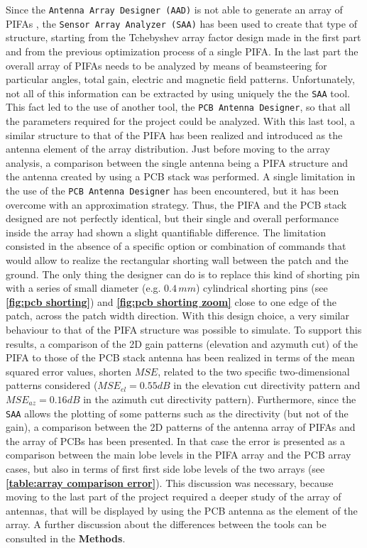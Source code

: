 \documentclass[10 pt,a4paper,twocolumn]{article}
\begin{document}
{Since the \texttt{Antenna Array Designer (AAD)} is not able to generate an array of PIFAs , the \texttt{Sensor Array Analyzer (SAA)} has been used to create that type of structure, starting from the Tchebyshev array factor design made in the first part and from the previous optimization process of a single PIFA. In the last part the overall array of PIFAs needs to be analyzed by means of beamsteering for particular angles, total gain, electric and magnetic field patterns. Unfortunately, not all of this information can be extracted by using uniquely the the \texttt{SAA} tool. This fact led to the use of another tool, the \texttt{PCB Antenna Designer}, so that all the parameters required for the project could be analyzed. With this last tool, a similar structure to that of the PIFA has been realized and introduced as the antenna element of the array distribution. Just before moving to the array analysis, a comparison between the single antenna being a PIFA structure and the antenna created by using a PCB stack was performed. A single limitation in the use of the \texttt{PCB Antenna Designer} has been encountered, but it has been overcome with an approximation strategy. Thus, the PIFA and the PCB stack designed are not perfectly identical, but their single and overall performance inside the array had shown a slight quantifiable difference. The limitation consisted in the absence of a specific option or combination of commands that would allow to realize the rectangular shorting wall between the patch and the ground. The only thing the designer can do is to replace this kind of shorting pin with a series of small diameter (e.g. $0.4\,mm$) cylindrical shorting pins (see \textbf{\cref{fig:pcb shorting}}) and \textbf{\cref{fig:pcb shorting zoom}} close to one edge of the patch, across the patch width direction. With this design choice, a very similar behaviour to that of the PIFA structure was possible to simulate. To support this results, a comparison of the 2D gain patterns (elevation and azymuth cut) of the PIFA to those of the PCB stack antenna has been realized in terms of the mean squared error values, shorten $MSE$, related to the two specific two-dimensional patterns considered ($MSE_{el}=0.55dB$ in the elevation cut directivity pattern and $MSE_{az}=0.16dB$ in the azimuth cut directivity pattern). Furthermore, since the \texttt{SAA} allows the plotting of some patterns such as the directivity (but not of the gain), a comparison between the 2D patterns of the antenna array of PIFAs and the array of PCBs has been presented. In that case the error is presented as a comparison between the main lobe levels in the PIFA array and the PCB array cases, but also in terms of first first side lobe levels of the two arrays (see \textbf{\cref{table:array comparison error}}). This discussion was necessary, because moving to the last part of the project required a deeper study of the array of antennas, that will be displayed by using the PCB antenna as the element of the array. A further discussion about the differences between the tools can be consulted in the \textbf{ Methods}. 

}
\end{document}
